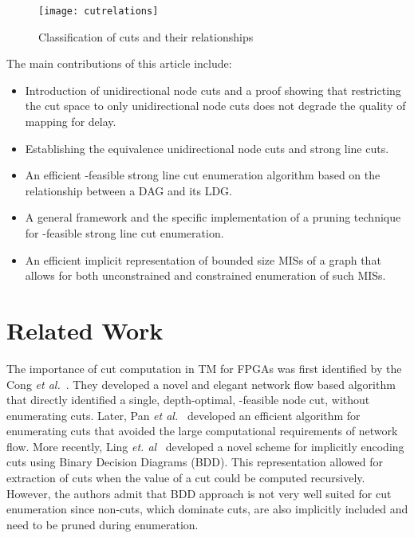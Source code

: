 \documentclass[journal]{IEEEtran}
\begin{document}
\begin{figure}[h]
\centering
\texttt{[image: cutrelations]}
\caption{Classification of cuts and their relationships}
\label{fig:cutrelations}
\end{figure}

The  main contributions of this article include:
\begin{itemize}
\item Introduction of unidirectional node cuts and a proof showing that restricting the cut space to only unidirectional node cuts does not degrade the quality of mapping for delay.
\item Establishing the equivalence unidirectional node cuts and strong line cuts.
\item An efficient -feasible strong line cut enumeration algorithm based on the relationship between a DAG and its LDG. 
\item A general framework and the specific implementation of a pruning technique for -feasible strong line cut enumeration.
\item An efficient implicit representation of bounded size MISs of a graph that allows for both unconstrained and constrained enumeration of such MISs.
\end{itemize}

\section{Related Work}
\label{sec:related-work}

The importance of cut computation in TM for FPGAs was first identified by the Cong \emph{et al.}~\cite{Cong1994}. They developed a novel and elegant network flow based algorithm that directly identified a single, depth-optimal, -feasible node cut, without enumerating cuts.  Later, Pan \emph{et al.}~\cite{pan_lin,Pan1998} developed an efficient algorithm for enumerating cuts that avoided the large computational requirements of network flow.  More recently, Ling \emph{et. al}~\cite{Ling2007} developed a novel scheme for implicitly encoding cuts using Binary Decision Diagrams (BDD).  This representation allowed for extraction of cuts when the value of a cut could be computed recursively.  However, the authors admit that BDD approach is not very well suited for cut enumeration since non-cuts, which dominate cuts, are also implicitly included and need to be pruned during enumeration.
\end{document}
